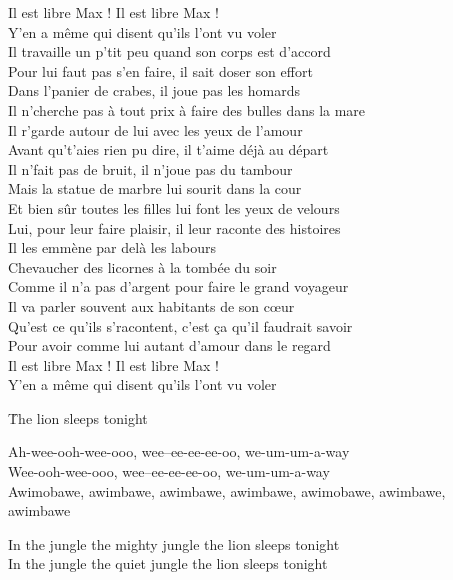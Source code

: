 \documentclass{novel}
\begin{document}
Il est libre Max ! Il est libre Max !\\
Y'en a même qui disent qu'ils l'ont vu voler\\

Il travaille un p'tit peu quand son corps est d'accord\\
Pour lui faut pas s'en faire, il sait doser son effort\\
Dans l'panier de crabes, il joue pas les homards\\
Il n'cherche pas à tout prix à faire des bulles dans la mare\\

Il r'garde autour de lui avec les yeux de l'amour\\
Avant qu't'aies rien pu dire, il t'aime déjà au départ\\
Il n'fait pas de bruit, il n'joue pas du tambour\\
Mais la statue de marbre lui sourit dans la cour\\

Et bien sûr toutes les filles lui font les yeux de velours\\
Lui, pour leur faire plaisir, il leur raconte des histoires\\
Il les emmène par delà les labours\\
Chevaucher des licornes à la tombée du soir\\

Comme il n'a pas d'argent pour faire le grand voyageur\\
Il va parler souvent aux habitants de son cœur\\
Qu'est ce qu'ils s'racontent, c'est ça qu'il faudrait savoir\\
Pour avoir comme lui autant d'amour dans le regard\\

Il est libre Max ! Il est libre Max !\\
Y'en a même qui disent qu'ils l'ont vu voler

\newpage
\normalsize
\h*{The lion sleeps tonight}

Ah-wee-ooh-wee-ooo, wee--ee-ee-ee-oo, we-um-um-a-way\\
Wee-ooh-wee-ooo, wee--ee-ee-ee-oo, we-um-um-a-way\\

Awimobawe, awimbawe, awimbawe, awimbawe, awimobawe, awimbawe, awimbawe

In the jungle the mighty jungle the lion sleeps tonight\\
In the jungle the quiet jungle the lion sleeps tonight
\end{document}
